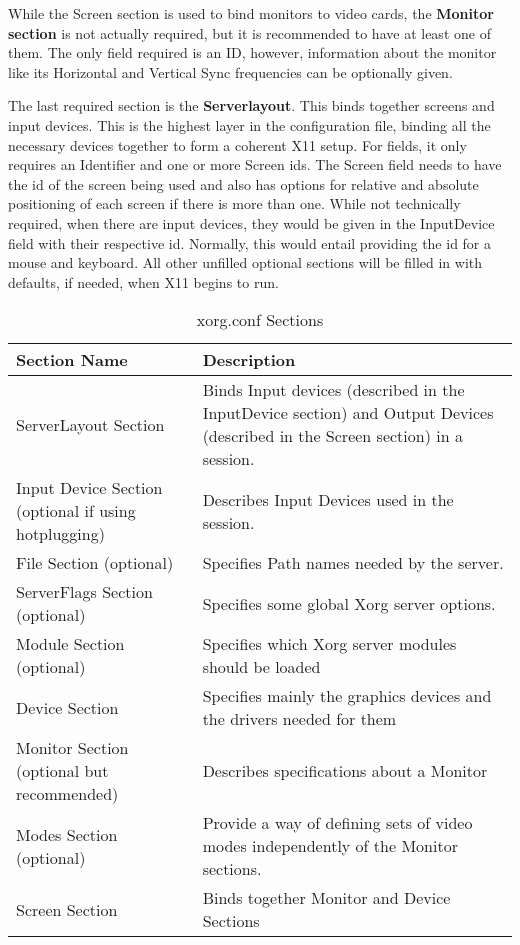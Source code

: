 \documentclass{acm_proc_article-sp}
\begin{document}
\par
While the Screen section is used to bind monitors to video cards, the \textbf{Monitor section} is not actually required, but it is recommended to have at least one of them. The only field required is an ID, however, information about the monitor like its Horizontal and Vertical Sync frequencies can be optionally given. 
\par
The last required section is the \textbf{Serverlayout}. This binds together screens and input devices. This is the highest layer in the configuration file, binding all the necessary devices together to form a coherent X11 setup. For fields, it only requires an Identifier and one or more Screen ids. The Screen field needs to have the id of the screen being used and also has options for relative and absolute positioning of each screen if there is more than one. While not technically required, when there are input devices, they would be given in the InputDevice field with their respective id. Normally, this would entail providing the id for a mouse and keyboard. 
All other unfilled optional sections will be filled in with defaults, if needed, when X11 begins to run. 

\begin{table}
 \centering
  \caption{xorg.conf Sections}
  \begin{tabular}{|p{4cm}|p{4cm}|} \hline
  \textbf{Section Name}&\textbf{Description}\\ \hline
 ServerLayout Section & Binds Input devices (described in the InputDevice section) and Output Devices (described in the Screen section) in a session.\\ \hline
 Input Device Section \newline (optional if using hotplugging) & Describes Input Devices used in the session.\\ \hline
 File Section (optional) & Specifies Path names needed by the server. \\ \hline
 ServerFlags Section \newline (optional) & Specifies some global Xorg server options.\\ \hline
 Module Section (optional) & Specifies which Xorg server modules should be loaded \\ \hline
 Device Section & Specifies mainly the graphics devices and the drivers needed for them\\ \hline
 Monitor Section \newline(optional but recommended) & Describes specifications about a Monitor \\ \hline
 Modes Section (optional) & Provide a way of defining sets of video modes independently of the Monitor sections.\\ \hline
 Screen Section & Binds together Monitor and Device Sections \\ \hline
\end{tabular}
\end{table}
\end{document}
